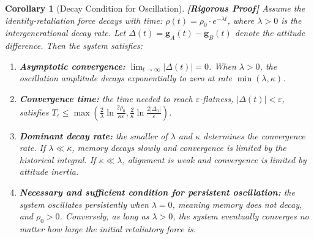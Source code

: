 \documentclass[12pt,a4paper]{article}
\newtheorem{corollary}[theorem]{Corollary}
\theoremstyle{remark}
\newcommand{\rigorFull}{\textnormal{\textbf{[Rigorous Proof]}}}
\begin{document}
\begin{corollary}[Decay Condition for Oscillation]\label{cor:oscillation_decay}\rigorFull
Assume the identity-retaliation force decays with time: $\rho(t) = \rho_0 \cdot e^{-\lambda t}$, where $\lambda > 0$ is the intergenerational decay rate. Let $\Delta(t) = \mathbf{g}_A(t) - \mathbf{g}_B(t)$ denote the attitude difference. Then the system satisfies:
\begin{enumerate}[label=(\roman*)]
    \item \textbf{Asymptotic convergence:} $\lim_{t \to \infty} |\Delta(t)| = 0$. When $\lambda > 0$, the oscillation amplitude decays exponentially to zero at rate $\min(\lambda, \kappa)$.
    \item \textbf{Convergence time:} the time needed to reach $\varepsilon$-flatness, $|\Delta(t)| < \varepsilon$, satisfies $T_\varepsilon \leq \max\left(\frac{2}{\lambda} \ln\frac{2\rho_0}{\kappa\varepsilon}, \frac{2}{\kappa} \ln\frac{2|\Delta_0|}{\varepsilon}\right)$.
    \item \textbf{Dominant decay rate:} the smaller of $\lambda$ and $\kappa$ determines the convergence rate. If $\lambda \ll \kappa$, memory decays slowly and convergence is limited by the historical integral. If $\kappa \ll \lambda$, alignment is weak and convergence is limited by attitude inertia.
    \item \textbf{Necessary and sufficient condition for persistent oscillation:} the system oscillates persistently when $\lambda = 0$, meaning memory does not decay, and $\rho_0 > 0$. Conversely, as long as $\lambda > 0$, the system eventually converges no matter how large the initial retaliatory force is.
\end{enumerate}
\end{corollary}
\end{document}
